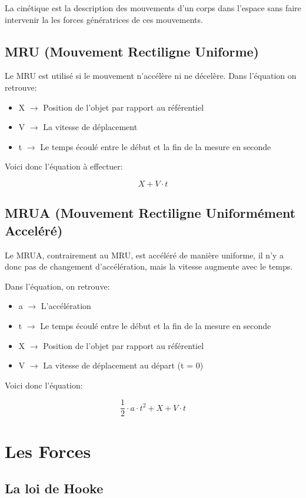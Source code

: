 \documentclass{article}
\begin{document}
La cinétique est la description des mouvements d'un corps dans l'espace sans faire
intervenir la les forces génératrices de ces mouvements.

\subsection{MRU (Mouvement Rectiligne Uniforme)}

Le MRU est utilisé si le mouvement n'accélère ni ne décelère. Dans l'équation on retrouve:
\begin{itemize}
	\item X $\rightarrow$ Position de l'objet par rapport au référentiel
	\item V $\rightarrow$ La vitesse de déplacement
	\item t $\rightarrow$ Le temps écoulé entre le début et la fin de la mesure en seconde
\end{itemize}

Voici donc l'équation à effectuer:

\begin{equation}
  X + V \cdot t
\end{equation}

\subsection{MRUA (Mouvement Rectiligne Uniformément Acceléré)}

Le MRUA, contrairement au MRU, est accéléré de manière uniforme, il n'y a donc pas de changement d'accélération, mais la vitesse augmente avec le temps.

Dans l'équation, on retrouve:
\begin{itemize}
	\item a $\rightarrow$ L'accélération
	\item t $\rightarrow$ Le temps écoulé entre le début et la fin de la mesure en seconde
	\item X $\rightarrow$ Position de l'objet par rapport au référentiel
	\item V $\rightarrow$ La vitesse de déplacement au départ (t = 0)
\end{itemize}

Voici donc l'équation:

\begin{equation}
	\frac{1}{2} \cdot a \cdot t^2 + X + V \cdot t
\end{equation}

\pagebreak
\section{Les Forces}

\subsection{La loi de Hooke}
\end{document}
